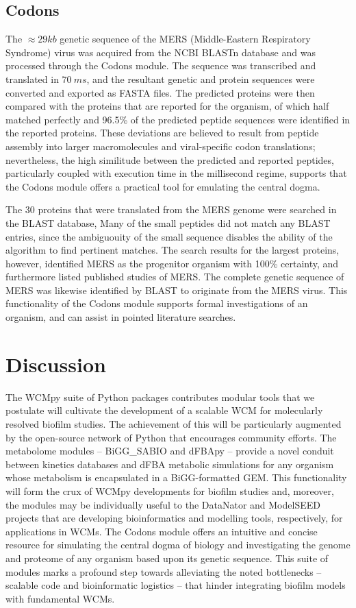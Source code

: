 \subsection*{Codons}
The $\approx 29kb$ genetic sequence of the MERS (Middle-Eastern Respiratory Syndrome) virus was acquired from the NCBI BLASTn database \cite{Enouf2013MiddleGenome} and was processed through the Codons module. The sequence was transcribed and translated in $70~ms$, and the resultant genetic and protein sequences were converted and exported as FASTA files. The predicted proteins were then compared with the proteins that are reported for the organism, of which half matched perfectly and 96.5\% of the predicted peptide sequences were identified in the reported proteins. These deviations are believed to result from peptide assembly into larger macromolecules and viral-specific codon translations; nevertheless, the high similitude between the predicted and reported peptides, particularly coupled with execution time in the millisecond regime, supports that the Codons module offers a practical tool for emulating the central dogma.

The 30 proteins that were translated from the MERS genome were searched in the BLAST database, Many of the small peptides did not match any BLAST entries, since the ambiguouity of the small sequence disables the ability of the algorithm to find pertinent matches. The search results for the largest proteins, however, identified MERS as the progenitor organism with 100\% certainty, and furthermore listed published studies of MERS. The complete genetic sequence of MERS was likewise identified by BLAST to originate from the MERS virus. This functionality of the Codons module supports formal investigations of an organism, and can assist in pointed literature searches. 

\section*{Discussion}
The WCMpy suite of Python packages contributes modular tools that we postulate will cultivate the development of a scalable WCM for molecularly resolved biofilm studies. The achievement of this will be particularly augmented by the open-source network of Python that encourages community efforts. The metabolome modules -- BiGG\_SABIO and dFBApy -- provide a novel conduit between kinetics databases and dFBA metabolic simulations for any organism whose metabolism is encapsulated in a BiGG-formatted GEM. This functionality will form the crux of WCMpy developments for biofilm studies and, moreover, the modules may be individually useful to the DataNator \cite{Roth2021Datanator:Behavior} and ModelSEED \cite{Seaver2021TheMicrobes} projects that are developing bioinformatics and modelling tools, respectively, for applications in WCMs. The Codons module offers an intuitive and concise resource for simulating the central dogma of biology and investigating the genome and proteome of any organism based upon its genetic sequence. This suite of modules marks a profound step towards alleviating the noted bottlenecks -- scalable code and bioinformatic logistics -- that hinder integrating biofilm models with fundamental WCMs. 

